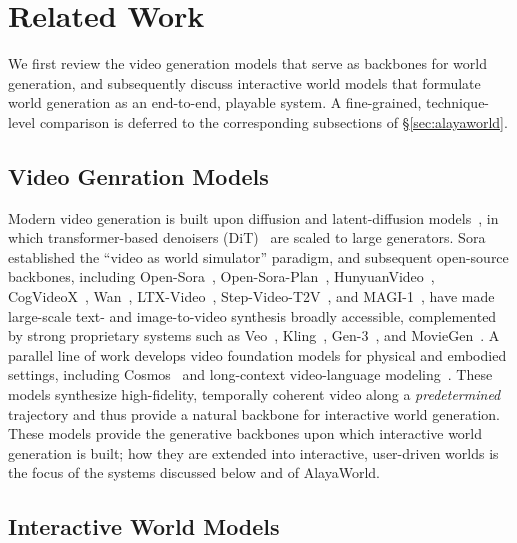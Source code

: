 \section{Related Work}

We first review the video generation models that serve as backbones for world generation, and subsequently discuss interactive world models that formulate world generation as an end-to-end, playable system.
A fine-grained, technique-level comparison is deferred to the corresponding subsections of \S\ref{sec:alayaworld}.

\subsection{Video Genration Models}

Modern video generation is built upon diffusion and latent-diffusion models~\cite{rombach2022high}, in which transformer-based denoisers (DiT)~\cite{peebles2023scalable} are scaled to large generators.
Sora~\cite{brooks2024video} established the ``video as world simulator'' paradigm, and subsequent open-source backbones, including Open-Sora~\cite{zheng2024open}, Open-Sora-Plan~\cite{lin2024open}, HunyuanVideo~\cite{kong2024hunyuanvideo}, CogVideoX~\cite{yang2025cogvideox}, Wan~\cite{wan2025wan}, LTX-Video~\cite{hacohen2024ltx}, Step-Video-T2V~\cite{ma2025step}, and MAGI-1~\cite{teng2025magi}, have made large-scale text- and image-to-video synthesis broadly accessible, complemented by strong proprietary systems such as Veo~\cite{google2024veo}, Kling~\cite{kuaishou2024kling}, Gen-3~\cite{runway2024gen3}, and MovieGen~\cite{polyak2024movie}.
A parallel line of work develops video foundation models for physical and embodied settings, including Cosmos~\cite{agarwal2025cosmos} and long-context video-language modeling~\cite{liu2025world}.
These models synthesize high-fidelity, temporally coherent video along a \emph{predetermined} trajectory and thus provide a natural backbone for interactive world generation.
These models provide the generative backbones upon which interactive world generation is built; how they are extended into interactive, user-driven worlds is the focus of the systems discussed below and of AlayaWorld.

\subsection{Interactive World Models}


